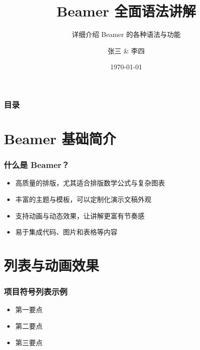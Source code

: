 \documentclass[aspectratio=169]{beamer}
\title{Beamer 全面语法讲解}         %
\subtitle{详细介绍 Beamer 的各种语法与功能} %
\author{张三 \& 李四}               %
\institute{某某大学 \\ 某某研究所}    %
\date{\today}                   %
\begin{document}
\begin{frame}
    \titlepage  
\end{frame}

\begin{frame}
    \frametitle{目录}
    \tableofcontents
\end{frame}

\section{Beamer 基础简介}
\begin{frame}
    \frametitle{什么是 Beamer？}
    \begin{itemize}
        \item 高质量的排版，尤其适合排版数学公式与复杂图表
        \item 丰富的主题与模板，可以定制化演示文稿外观
        \item 支持动画与动态效果，让讲解更富有节奏感
        \item 易于集成代码、图片和表格等内容
    \end{itemize}
\end{frame}

\section{列表与动画效果}
\begin{frame}
    \frametitle{项目符号列表示例}
    \begin{itemize}
        \item 第一要点
        \item 第二要点
        \item 第三要点
    \end{itemize}
\end{frame}
\end{document}
